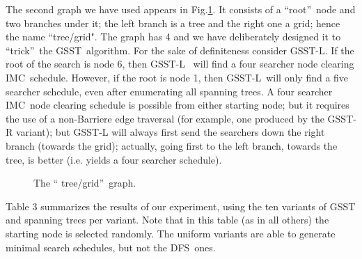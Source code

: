 \documentclass[11pt]{article}\usepackage{amsmath}
\begin{document}
The second graph we have used appears in Fig.\ref{fig05}. It consists of a
\textquotedblleft root\textquotedblright\ node and two branches under it; the
left branch is a tree and the right one a grid; hence the name
\textquotedblleft tree/grid". The graph has 4 and we have
deliberately designed it to \textquotedblleft trick\textquotedblright\ the
GSST\ algorithm. For the sake of definiteness consider GSST-L. If the root of
the search is node 6, then GSST-L \ will find a four searcher node clearing
IMC\ schedule. However, if the root is node 1, then GSST-L\ will only find a
five searcher schedule, even after enumerating all spanning trees. A four
searcher IMC\ node clearing schedule is possible from either starting node;
but it requires the use of a non-Barriere edge traversal (for example, one
produced by the GSST-R variant); but GSST-L will always first send the
searchers down the right branch (towards the grid); actually, going first to
the left branch, towards the tree, is better (i.e. yields a four searcher schedule).

\begin{figure}[h]
\centering
{}\caption{The \textquotedblleft
tree/grid\textquotedblright\ graph.}\label{fig05}\end{figure}

Table 3 summarizes the results of our experiment, using the ten variants of
GSST and  spanning trees per variant. Note that in this table
(as in all others) the starting node is selected randomly. The uniform
variants are able to generate minimal search schedules, but not the DFS\ ones.
\end{document}
